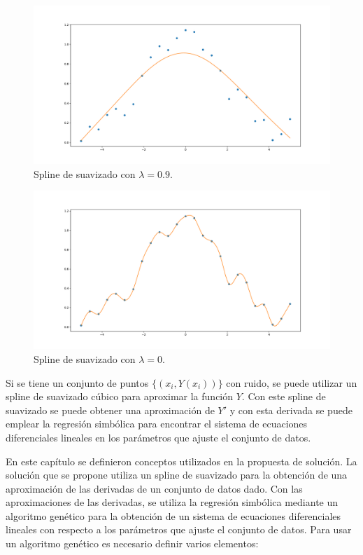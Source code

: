 \begin{figure}[h]
    \centering
    \includegraphics[width=\textwidth]{"figures/spline_0.1.pdf"}
    \caption{Spline de suavizado con $\lambda = 0.9$.}
    \label{fig:spline_0.1}
\end{figure}

\begin{figure}[h]
    \centering
    \includegraphics[width=\textwidth]{"figures/spline_1.pdf"}
    \caption{Spline de suavizado con $\lambda = 0$.}
    \label{fig:spline_1}
\end{figure}


Si se tiene un conjunto de puntos $\{(x_i, Y(x_i))\}$ con ruido, se puede utilizar un spline de suavizado cúbico para aproximar la función $Y$. Con este spline de suavizado se puede obtener una aproximación de $Y'$ y con esta derivada se puede emplear la regresión simbólica para encontrar el sistema de ecuaciones diferenciales lineales en los parámetros que ajuste el conjunto de datos.

En este capítulo se definieron conceptos utilizados en la propuesta de solución. La solución que se propone utiliza un spline de suavizado para la obtención de una aproximación de las derivadas de un conjunto de datos dado. Con las aproximaciones de las derivadas, se utiliza la regresión simbólica mediante un algoritmo genético para la obtención de un sistema de ecuaciones diferenciales lineales con respecto a los parámetros que ajuste el conjunto de datos. Para usar un algoritmo genético es necesario definir varios elementos:

